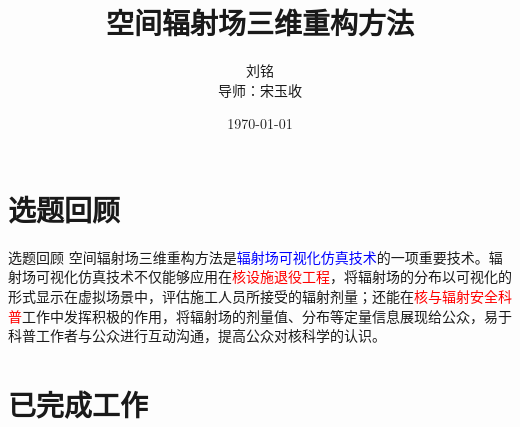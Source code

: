 \documentclass{beamer}
\title{空间辐射场三维重构方法}
\author[刘铭]{%
    刘铭\\
    导师：宋玉收%
}
\institute{哈尔滨工程大学核科学与技术学院}
\date{\AdvanceDate[+1]\today}
\begin{document}
\begin{frame}
    \maketitle
\end{frame}

\begin{frame}
    \tableofcontents
\end{frame}

\section{选题回顾}

\begin{frame}{选题回顾}
    空间辐射场三维重构方法是\textcolor{blue}{辐射场可视化仿真技术}的一项重要技术。辐射场可视化仿真技术不仅能够应用在\textcolor{red}{核设施退役工程}，将辐射场的分布以可视化的形式显示在虚拟场景中，评估施工人员所接受的辐射剂量；还能在\textcolor{red}{核与辐射安全科普}工作中发挥积极的作用，将辐射场的剂量值、分布等定量信息展现给公众，易于科普工作者与公众进行互动沟通，提高公众对核科学的认识。
\end{frame}

\section{已完成工作}
\end{document}
